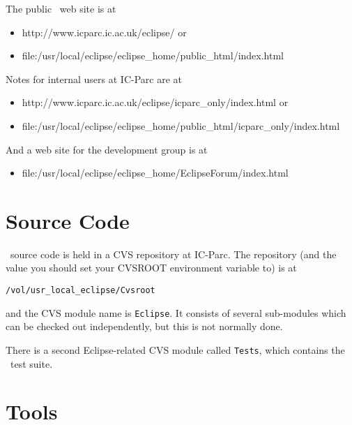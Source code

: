 The public \eclipse\ web site is at
\begin{itemize}
\item {}
{http://www.icparc.ic.ac.uk/eclipse/} or
\item {}
{file:/usr/local/eclipse/eclipse_home/public_html/index.html}
\end{itemize}
Notes for internal users at IC-Parc are at
\begin{itemize}
\item {}
{http://www.icparc.ic.ac.uk/eclipse/icparc_only/index.html} or
\item {}
{file:/usr/local/eclipse/eclipse_home/public_html/icparc_only/index.html}
\end{itemize}
And a web site for the development group is at
\begin{itemize}
\item {}
{file:/usr/local/eclipse/eclipse_home/EclipseForum/index.html}
\end{itemize}


\section{Source Code}

\eclipse\ source code is held in a CVS repository at IC-Parc.
The repository (and the value you should set your CVSROOT environment
variable to) is at
\begin{verbatim}
/vol/usr_local_eclipse/Cvsroot
\end{verbatim}
and the CVS module name is {\tt Eclipse}.
It consists of several sub-modules which can be checked out
independently, but this is not normally done.

There is a second Eclipse-related CVS module called {\tt Tests},
which contains the \eclipse\ test suite.


\section{Tools}


